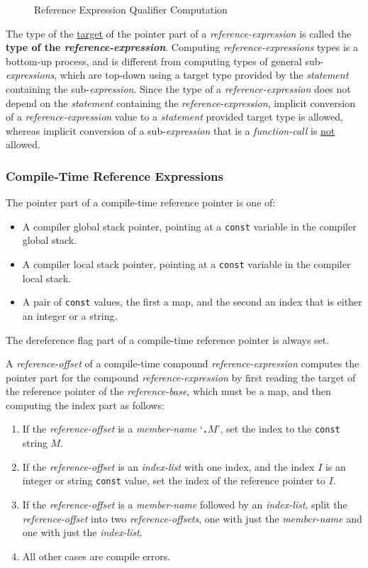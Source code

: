 \documentclass[12pt]{article}
\newcommand{\TT}[1]{{\tt \bfseries #1}}
\newcommand{\key}[1]{{\rm \bfseries #1}}
\newlength{\figurewidth}
\newenvironment{boxedfigure}[1][!btp]%
	{\begin{figure*}[#1]
	 \begin{lrbox}{\figurebox}
	 \begin{minipage}{\figurewidth}

	 \vspace*{1ex}}%
	{
	 \vspace*{1ex}

	 \end{minipage}
	 \end{lrbox}

	 \centering
	 \fbox{\hspace*{0.1in}\usebox{\figurebox}\hspace*{0.1in}}
	 \end{figure*}}
\begin{document}
\begin{boxedfigure}[!t]
\caption{Reference Expression Qualifier Computation}
\label{REFERENCE-EXPRESSION-QUALIFIER-COMPUTATION}
\end{boxedfigure}

The type of the \underline{target} of the
pointer part of a {\em reference-expression} is called
the \key{type of the {\em reference-expression}}.
Computing {\em reference-expressions} types
is a bottom-up process,
and is different from computing types of general
sub-{\em expressions}, which are top-down using a target type
provided by the {\em statement} containing the sub-{\em expression}.
Since the type of a {\em reference-expression} does not depend on
the {\em statement} containing the {\em reference-expression},
implicit conversion of a
{\em reference-expression} value to a {\em statement} provided
target type is allowed, whereas implicit conversion
of a sub-{\em expression} that is a {\em function-call}
is \underline{not} allowed.

\subsubsection{Compile-Time Reference Expressions}
\label{Compile-TIME-REFERENCE-EXPRESSIONS}

The pointer part of a compile-time reference pointer is one of:
\begin{itemize}
\item A compiler global stack pointer, pointing at a {\tt const}
variable in the compiler global stack.
\item A compiler local stack pointer, pointing at a {\tt const}
variable in the compiler local stack.
\item A pair of {\tt const} values, the first a map, and the
second an index that is either an integer or a string.
\end{itemize}
The dereference flag part of a compile-time reference pointer is
always set.

A {\em reference-offset} of a compile-time compound {\em reference-expression}
computes the pointer part for the compound {\em reference-expression}
by first reading the target of the reference pointer of the
{\em reference-base}, which must be a map, and then computing
the index part as follows:
\begin{enumerate}
\item If the {\em reference-offset} is a {\em member-name} `\TT{.}$M$',
set the index to the {\tt const} string $M$.
\item If the {\em reference-offset} is an {\em index-list} with one
index, and the index $I$ is an integer or string {\tt const} value,
set the index of the reference pointer to $I$.
\item If the {\em reference-offset} is a {\em member-name} followed
by an {\em index-list}, split the {\em reference-offset} into two
{\em reference-offsets}, one with just the {\em member-name} and one with
just the {\em index-list}.
\item All other cases are compile errors.
\end{enumerate}
\end{document}
